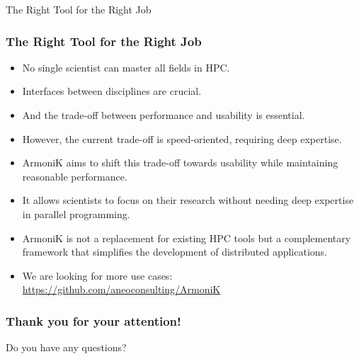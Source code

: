 \documentclass[10pt,aspectratio=1609]{beamer}
\begin{document}
\begin{section}{The Right Tool for the Right Job}
 \begin{frame}
   \frametitle{The Right Tool for the Right Job}
   \begin{itemize}
     \item No single scientist can master all fields in HPC.
     \item Interfaces between disciplines are crucial.
     \item And the trade-off between performance and usability is essential.
     \item However, the current trade-off is speed-oriented, requiring deep expertise.
     \item ArmoniK aims to shift this trade-off towards usability while maintaining reasonable performance.
     \item It allows scientists to focus on their research without needing deep expertise in parallel programming.
     \item ArmoniK is not a replacement for existing HPC tools but a complementary framework that simplifies the development of distributed applications.
     \item We are looking for more use cases: \url{https://github.com/aneoconsulting/ArmoniK}
   \end{itemize}
 \end{frame}

 \begin{frame}
   \frametitle{Thank you for your attention!}
   Do you have any questions?
 \end{frame}
\end{section}
\end{document}
